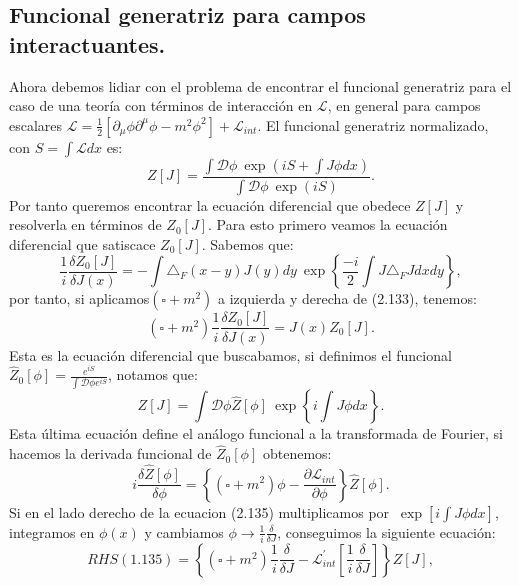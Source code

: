 \subsection{Funcional generatriz para campos interactuantes.}
Ahora debemos lidiar con el problema de encontrar el funcional generatriz para el caso de una teoría con términos de interacción en $\mathcal{L}$, en general para campos escalares $\mathcal{L}=\frac{1}{2}\left[\partial_{\mu}\phi\partial^{\mu}\phi-m^{2}\phi^{2}\right]+\mathcal{L}_{int}$. El funcional generatriz normalizado, con $S=\int \mathcal{L}dx$ es:
\begin{equation}
Z[J]=\frac{\int\mathcal{D}\phi\ \exp\left(iS+\int J\phi dx\right)}{\int\mathcal{D}\phi\ \exp\left(iS\right)} .
\end{equation}
Por tanto queremos encontrar la ecuación diferencial que obedece $Z[J]$ y resolverla en términos de $Z_0[J]$. Para esto primero veamos la ecuación diferencial que satiscace $Z_0[J]$. Sabemos que:
\begin{equation}
\frac{1}{i}\frac{\delta Z_{0}[J]}{\delta J(x)}=-\int\triangle_{F}(x-y)J(y)dy\ \exp\left\{ \frac{-i}{2}\int J\triangle_{F}Jdxdy\right\} ,
\end{equation}
por tanto, si aplicamos$(\square +m^2)$ a izquierda y derecha de (2.133), tenemos:
\begin{equation}
(\square +m^{2})\frac{1}{i}\frac{\delta Z_{0}[J]}{\delta J(x)}=J(x)Z_{0}[J] .
\end{equation}
Esta es la ecuación diferencial que buscabamos, si definimos el funcional $\hat{Z}_0[\phi]=\frac{e^{iS}}{\int \mathcal{D}\phi e^{iS}}$, notamos que:
\begin{equation}
Z[J]=\int\mathcal{D}\phi\hat{Z}[\phi]\ \exp\left\{ i\int J\phi dx\right\} .
\end{equation}
Esta última ecuación define el análogo funcional a la transformada de Fourier, si hacemos la derivada funcional de $\hat{Z}_0[\phi]$ obtenemos:
\begin{equation}
i\frac{\delta\hat{Z}[\phi]}{\delta\phi}=\left\{ (\square+m^{2})\phi-\frac{\partial\mathcal{L}_{int}}{\partial\phi}\right\} \hat{Z}[\phi] .
\end{equation}
Si en el lado derecho de la ecuacion (2.135) multiplicamos por $\ \exp[i\int J\phi dx]$, integramos en $\phi(x)$ y cambiamos $\phi \rightarrow \frac{1}{i}\frac{\delta}{\delta J}$, conseguimos la siguiente ecuación:
\begin{equation}
RHS(1.135)=\left\{ (\square +m^{2})\frac{1}{i}\frac{\delta}{\delta J}-\mathcal{L}_{int}^{\prime}\left[\frac{1}{i}\frac{\delta}{\delta J}\right]\right\} Z[J],
\end{equation} 
